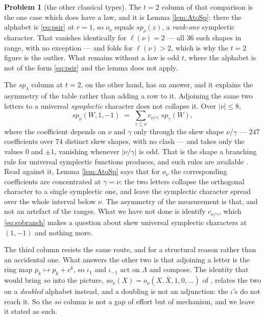\documentclass[11pt,reqno]{amsart}
\theoremstyle{plain}
\theoremstyle{definition}
\newtheorem{problem}[theorem]{Problem}
\begin{document}
\begin{problem}[the other classical types]
The $t=2$ column of that comparison is the one case which does have a law, and it is Lemma
\ref{lem:AtoSp}: there the alphabet is \eqref{eq:psir} at $r=1$, so $o_\nu$ equals $sp_\nu(z)$, a
\emph{rank-one} symplectic character. That vanishes identically for $\ell(\nu)=2$ --- all $36$ such
shapes in range, with no exception --- and folds for $\ell(\nu)>2$, which is why the $t=2$ figure is
the outlier. What remains without a law is odd $t$, where the alphabet is not of the form
\eqref{eq:psir} and the lemma does not apply.

The $sp_\lambda$ column at $t=2$, on the other hand, has an answer, and it explains the asymmetry of
the table rather than adding a row to it. Adjoining the same two letters to a universal
\emph{symplectic} character does not collapse it. Over $|\nu|\le8$,
\begin{equation}\label{eq:spbranch}
sp_\nu(W,1,-1)\;=\;\sum_{\gamma\subseteq\nu}c_{\nu/\gamma}\;sp_\gamma(W),
\end{equation}
where the coefficient depends on $\nu$ and $\gamma$ only through the skew shape $\nu/\gamma$ ---
$247$ coefficients over $74$ distinct skew shapes, with no clash --- and takes only the values $0$
and $\pm1$, vanishing whenever $|\nu/\gamma|$ is odd. That is the shape a branching rule for
universal symplectic functions produces, and such rules are available \cite{JJLW24}. Read against it,
Lemma \ref{lem:AtoSp} says that for $o_\nu$ the corresponding coefficients are concentrated at
$\gamma=\nu$: the two letters collapse the orthogonal character to a single symplectic one, and leave
the symplectic character spread over the whole interval below $\nu$. The asymmetry of the measurement
is that, and not an artefact of the ranges. What we have not done is identify $c_{\nu/\gamma}$, which
\eqref{eq:spbranch} makes a question about skew universal symplectic characters at $(1,-1)$ and
nothing more.

The third column resists the same route, and for a structural reason rather than an accidental one.
What answers the other two is that adjoining a letter is the ring map $p_k\mapsto p_k+c^k$, so
$\iota_{1}$ and $\iota_{-1}$ act on $\Lambda$ and compose. The identity that would bring $so$ into
the picture, $so_\nu(X)=o_\nu(X,\bar X,1,0,\dots)$ of \cite[(2.13)]{AK25}, relates the two on a
\emph{doubled} alphabet instead, and a doubling is not an adjunction: the $\iota$'s do not reach it.
So the $so$ column is not a gap of effort but of mechanism, and we leave it stated as such.
\end{problem}
\end{document}
